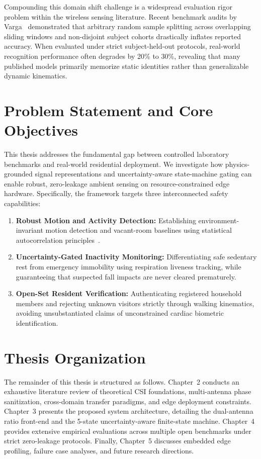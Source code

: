Compounding this domain shift challenge is a widespread evaluation rigor problem within the wireless sensing literature. Recent benchmark audits by Varga~\cite{author2024mitigating} demonstrated that arbitrary random sample splitting across overlapping sliding windows and non-disjoint subject cohorts drastically inflates reported accuracy. When evaluated under strict subject-held-out protocols, real-world recognition performance often degrades by 20\% to 30\%, revealing that many published models primarily memorize static identities rather than generalizable dynamic kinematics.

\section{Problem Statement and Core Objectives}
This thesis addresses the fundamental gap between controlled laboratory benchmarks and real-world residential deployment. We investigate how physics-grounded signal representations and uncertainty-aware state-machine gating can enable robust, zero-leakage ambient sensing on resource-constrained edge hardware. Specifically, the framework targets three interconnected safety capabilities:
\begin{enumerate}
    \item \textbf{Robust Motion and Activity Detection:} Establishing environment-invariant motion detection and vacant-room baselines using statistical autocorrelation principles~\cite{author2019widetect}.
    \item \textbf{Uncertainty-Gated Inactivity Monitoring:} Differentiating safe sedentary rest from emergency immobility using respiration liveness tracking, while guaranteeing that suspected fall impacts are never cleared prematurely.
    \item \textbf{Open-Set Resident Verification:} Authenticating registered household members and rejecting unknown visitors strictly through walking kinematics, avoiding unsubstantiated claims of unconstrained cardiac biometric identification.
\end{enumerate}

\section{Thesis Organization}
The remainder of this thesis is structured as follows. Chapter~2 conducts an exhaustive literature review of theoretical CSI foundations, multi-antenna phase sanitization, cross-domain transfer paradigms, and edge deployment constraints. Chapter~3 presents the proposed system architecture, detailing the dual-antenna ratio front-end and the 5-state uncertainty-aware finite-state machine. Chapter~4 provides extensive empirical evaluations across multiple open benchmarks under strict zero-leakage protocols. Finally, Chapter~5 discusses embedded edge profiling, failure case analyses, and future research directions.
